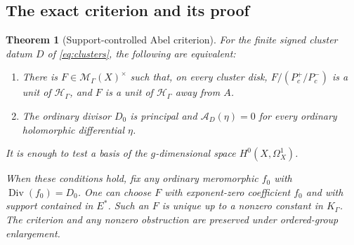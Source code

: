 \documentclass[11pt,letterpaper]{article}
\numberwithin{equation}{section}
\newtheorem{theorem}{Theorem}[section]
\theoremstyle{definition}
\theoremstyle{remark}
\newcommand{\HH}{\mathcal H}
\newcommand{\MM}{\mathscr M}
\newcommand{\Div}{\operatorname{Div}}
\newcommand{\Hg}{\HH_\Gamma}
\newcommand{\Mg}{\MM_\Gamma}
\newcommand{\Kg}{K_\Gamma}
\begin{document}
\subsection{The exact criterion and its proof}
\begin{theorem}[Support-controlled Abel criterion]
\label{thm:abel}
For the finite signed cluster datum $D$ of \eqref{eq:clusters}, the
following are equivalent:
\begin{enumerate}[label=\textup{(\roman*)},leftmargin=2.7em]
\item There is $F\in\Mg(X)^\times$ such that, on every cluster disk,
$F/(P_c^+/P_c^-)$ is a unit of $\Hg$, and $F$ is a unit of $\Hg$
away from $A$.
\item The ordinary divisor $D_0$ is principal and
$\mathcal A_D(\eta)=0$ for every ordinary holomorphic differential $\eta$.
\end{enumerate}
It is enough to test a basis of the $g$-dimensional space
$H^0(X,\Omega_X^1)$.

When these conditions hold, fix any ordinary meromorphic $f_0$ with
$\Div(f_0)=D_0$. One can choose $F$ with exponent-zero coefficient $f_0$
and with support contained in $E^*$. Such an $F$ is unique up to a
nonzero constant in $\Kg$. The criterion and any nonzero obstruction
are preserved under ordered-group enlargement.
\end{theorem}
\end{document}
